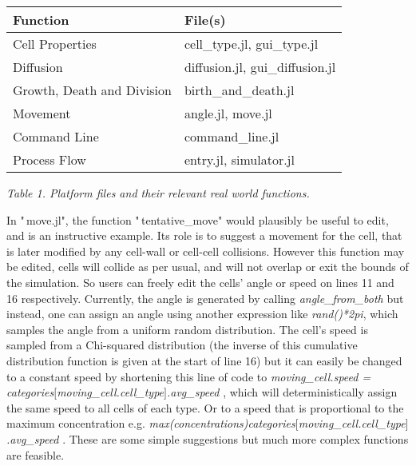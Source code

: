 \documentclass[12pt,a4paper]{report}
\begin{document}
\begin{table}[H]
\centering
\begin{tabular}{|l|l|}
\hline
{\bfseries Function} & {\bfseries File(s)} \\
\hline
Cell Properties & cell\_type.jl, gui\_type.jl \\
\hline
Diffusion & diffusion.jl, gui\_diffusion.jl \\
\hline
Growth, Death and Division & birth\_and\_death.jl \\
\hline
Movement & angle.jl, move.jl \\
\hline
Command Line & command\_line.jl \\
\hline
Process Flow & entry.jl, simulator.jl \\
\hline
\end{tabular}
\end{table}
{\itshape Table 1. Platform files and their relevant real world 
functions.}





In "\,move.jl", the function "\,tentative\_move" would plausibly be 
useful to edit, and is an instructive example. Its role is to suggest a 
movement for the cell, that is later modified by any cell-wall or 
cell-cell collisions. However this function may be edited, cells will 
collide as per usual, and will not overlap or exit the bounds of the 
simulation. So users can freely edit the cells' angle or speed on lines 
11 and 16 respectively. Currently, the angle is generated by calling 
{\itshape angle\_from\_both} but instead, one can assign an angle using 
another expression like {\itshape rand()*2pi}, which samples the angle 
from a uniform random distribution. The cell's speed is sampled from a 
Chi-squared distribution (the inverse of this cumulative distribution 
function is given at the start of line 16) but it can easily be changed 
to a constant speed by shortening this line of code to {\itshape 
moving\_cell.speed = categories$[$moving\_cell.cell\_type$]$.avg\_speed
}, which will deterministically assign the same speed to all cells of 
each type. Or to a speed that is proportional to the maximum 
concentration e.g. {\itshape 
max(concentrations)categories$[$moving\_cell.cell\_type$]$.avg\_speed}
. These are some simple suggestions but much more complex functions are 
feasible.



\begin{figure}[H]
\centering
\end{figure}
\end{document}
